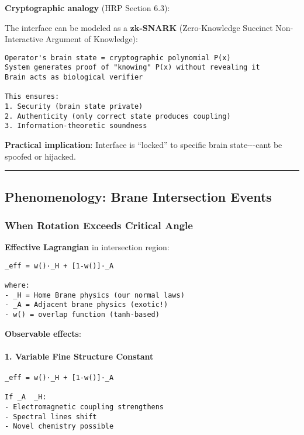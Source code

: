 \textbf{Cryptographic analogy} (HRP Section 6.3):

The interface can be modeled as a \textbf{zk-SNARK} (Zero-Knowledge
Succinct Non-Interactive Argument of Knowledge):

\begin{verbatim}
Operator's brain state = cryptographic polynomial P(x)
System generates proof of "knowing" P(x) without revealing it
Brain acts as biological verifier

This ensures:
1. Security (brain state private)
2. Authenticity (only correct state produces coupling)
3. Information-theoretic soundness
\end{verbatim}

\textbf{Practical implication}: Interface is ``locked'' to specific
brain state-\/-\/-can\textquotesingle t be spoofed or hijacked.

\begin{center}\rule{0.5\linewidth}{0.5pt}\end{center}

\subsection{Phenomenology: Brane Intersection
Events}\label{phenomenology-brane-intersection-events}

\subsubsection{When Rotation Exceeds Critical
Angle}\label{when-rotation-exceeds-critical-angle}

\textbf{Effective Lagrangian} in intersection region:

\begin{verbatim}
_eff = w()·_H + [1-w()]·_A

where:
- _H = Home Brane physics (our normal laws)
- _A = Adjacent brane physics (exotic!)
- w() = overlap function (tanh-based)
\end{verbatim}

\textbf{Observable effects}:

\paragraph{1. Variable Fine Structure
Constant}\label{variable-fine-structure-constant}

\begin{verbatim}
_eff = w()·_H + [1-w()]·_A

If _A  _H:
- Electromagnetic coupling strengthens
- Spectral lines shift
- Novel chemistry possible
\end{verbatim}

